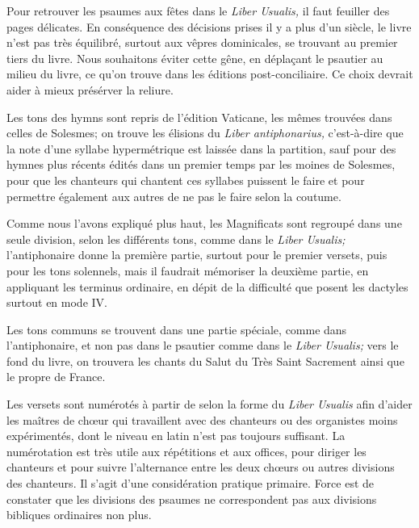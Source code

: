 \begin{frpars}
Pour retrouver les psaumes aux fêtes dans le \textit{Liber Usualis,} il faut feuiller des pages délicates. En conséquence des décisions prises il y a plus d'un siècle, le livre n'est pas très équilibré, surtout aux vêpres dominicales, se trouvant au premier tiers du livre. Nous souhaitons éviter cette gêne, en déplaçant le psautier au milieu du livre, ce qu'on trouve dans les éditions post-conciliaire. Ce choix devrait aider à mieux présérver la reliure.

Les tons des hymns sont repris de l'édition Vaticane, les mêmes trouvées dans celles de Solesmes; on trouve les élisions du  \textit{Liber antiphonarius,} c’est-à-dire que la note d'une syllabe hypermétrique est laissée dans la partition, sauf pour des hymnes plus récents édités dans un premier temps par les moines de Solesmes, pour que les chanteurs qui chantent ces syllabes puissent le faire et pour permettre également aux autres de ne pas le faire selon la coutume. 

Comme nous l'avons expliqué plus haut, les Magnificats sont regroupé dans une seule division, selon les différents tons, comme dans le \textit{Liber Usualis;} l'antiphonaire donne la première partie, surtout pour le premier versets, puis pour les tons solennels, mais il faudrait mémoriser la deuxième partie, en appliquant les terminus ordinaire, en dépit de la difficulté que posent les dactyles surtout en mode IV.

Les tons communs se trouvent dans une partie spéciale, comme dans l'antiphonaire, et non pas dans le psautier comme dans  le \textit{Liber Usualis;} vers le fond du livre, on trouvera les chants du Salut du Très Saint Sacrement ainsi que le propre de France.

Les versets sont numérotés à partir de  selon la forme du \textit{Liber Usualis} afin d'aider les maîtres de chœur qui travaillent avec des chanteurs ou des organistes moins expérimentés, dont le niveau en latin n'est pas toujours suffisant. La numérotation est très utile aux répétitions et aux offices, pour diriger les chanteurs et pour suivre l'alternance entre les deux chœurs ou autres divisions des chanteurs. Il s'agit d'une considération pratique primaire. Force est de constater que les divisions des psaumes ne correspondent pas aux divisions bibliques ordinaires non plus.
\end{frpars}